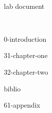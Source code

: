 \newpage ~



\frontmatter %

{lab document} %

\tableofcontents    %
\listoffigures      %
\listoftables       %

\newpage ~ %


{0-introduction}


\mainmatter %

{31-chapter-one}

{32-chapter-two}



\backmatter %
           


{biblio}

\appendix   %


{61-appendix}